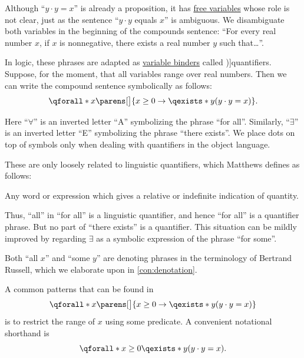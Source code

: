 \begin{concept}
\begin{thmenum}
     Although \enquote{\( y \cdot y = x \)} is already a proposition, it has \hyperref[con:variable_binding]{free variables} whose role is not clear, just as the sentence \enquote{\( y \cdot y \) equals \( x \)} is ambiguous. We disambiguate both variables in the beginning of the compounds sentence: \enquote{For every real number \( x \), if \( x \) is nonnegative, there exists a real number \( y \) such that\ldots}.

    In logic, these phrases are adapted as \hyperref[con:variable_binding]{variable binders} called \term[en=quantifiers (\cite[73]{Kleene1971Metamathematics})]{quantifiers}. Suppose, for the moment, that all variables range over real numbers. Then we can write the compound sentence symbolically as follows:
    \begin{equation*}
      \qforall* x \parens[\big]{ x \geq 0 \rightarrow \qexists* y (y \cdot y = x) }.
    \end{equation*}

    Here \enquote{\( \forall \)} is an inverted letter \enquote{\textsf{A}} symbolizing the phrase \enquote{for all}. Similarly, \enquote{\( \exists \)} is an inverted letter \enquote{\textsf{E}} symbolizing the phrase \enquote{there exists}. We place dots on top of symbols only when dealing with quantifiers in the object language.

    These are only loosely related to linguistic quantifiers, which Matthews defines as follows:
    \begin{displayquote}
      Any word or expression which gives a relative or indefinite indication of quantity.
    \end{displayquote}

    Thus, \enquote{all} in \enquote{for all} is a linguistic quantifier, and hence \enquote{for all} is a quantifier phrase. But no part of \enquote{there exists} is a quantifier. This situation can be mildly improved by regarding \( \exists \) as a symbolic expression of the phrase \enquote{for some}.

    Both \enquote{all \( x \)} and \enquote{some \( y \)} are denoting phrases in the terminology of Bertrand Russell, which we elaborate upon in \cref{con:denotation}.

     A common patterns that can be found in
    \begin{equation*}
      \qforall* x \parens[\big]{ x \geq 0 \rightarrow \qexists* y (y \cdot y = x) }
    \end{equation*}
    is to restrict the range of \( x \) using some predicate. A convenient notational shorthand is
    \begin{equation*}
      \qforall* {x \geq 0} \qexists* y (y \cdot y = x).
    \end{equation*}


\end{thmenum}
\end{concept}
